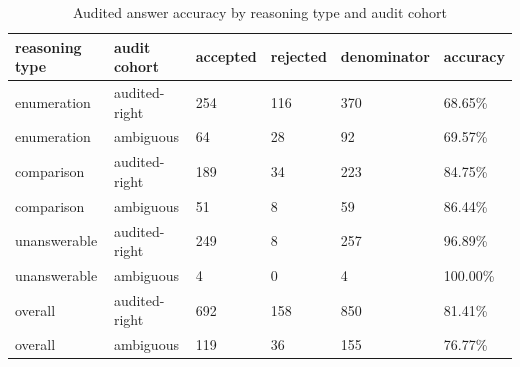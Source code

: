 \begin{table}[htbp]
\centering
\setlength{\tabcolsep}{5pt}
\caption{Audited answer accuracy by reasoning type and audit cohort}
\label{tab:d5c-audit-six-cell}
\begin{tabular}{llllll}
\toprule
reasoning type & audit cohort & accepted & rejected & denominator & accuracy \\
\midrule
enumeration & audited-right & 254 & 116 & 370 & 68.65\% \\
enumeration & ambiguous & 64 & 28 & 92 & 69.57\% \\
comparison & audited-right & 189 & 34 & 223 & 84.75\% \\
comparison & ambiguous & 51 & 8 & 59 & 86.44\% \\
unanswerable & audited-right & 249 & 8 & 257 & 96.89\% \\
unanswerable & ambiguous & 4 & 0 & 4 & 100.00\% \\
overall & audited-right & 692 & 158 & 850 & 81.41\% \\
overall & ambiguous & 119 & 36 & 155 & 76.77\% \\
\bottomrule
\end{tabular}
\end{table}
